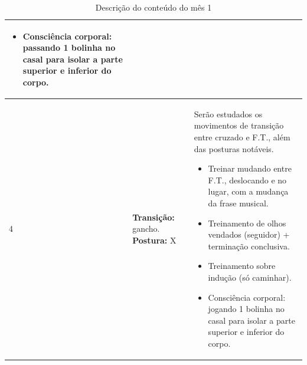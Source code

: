 \documentclass[12pt, a4paper]{article}
\begin{document}
\begin{table}[h]
\begin{tabular}{|p{0.5cm}|p{3.0cm}|p{12.0cm}|}
\begin{itemize}
        \item Consciência corporal: passando 1 bolinha no casal para isolar a parte superior e inferior do corpo.
        \end{itemize}
        \\ \hline
4 &  \textbf{Transição:} gancho. \textbf{Postura:} X &  Serão estudados os movimentos de transição entre cruzado e F.T., além das posturas notáveis.
        \begin{itemize}
        \item Treinar mudando entre F.T., deslocando e no lugar, com a mudança da frase musical.
        \item Treinamento de  olhos vendados (seguidor) + terminação conclusiva.
        \item Treinamento sobre indução (só caminhar).
        \item Consciência corporal: jogando 1 bolinha no casal para isolar a parte superior e inferior do corpo.
        \end{itemize}
        \\ \hline 
\end{tabular}
\caption{Descrição do conteúdo do mês 1}
\label{tab:myfirsttable}
\end{table}
\end{document}
